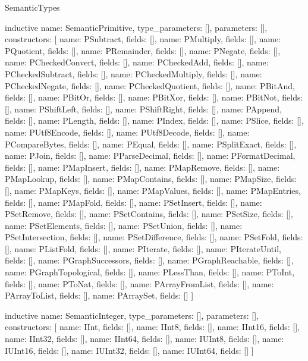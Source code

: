 \begin{lexlean}{SemanticTypes}
\begin{semanticmodule}
inductive{
  name: SemanticPrimitive,
  type_parameters: [],
  parameters: [],
  constructors: [
    {name: PSubtract, fields: []},
    {name: PMultiply, fields: []},
    {name: PQuotient, fields: []},
    {name: PRemainder, fields: []},
    {name: PNegate, fields: []},
    {name: PCheckedConvert, fields: []},
    {name: PCheckedAdd, fields: []},
    {name: PCheckedSubtract, fields: []},
    {name: PCheckedMultiply, fields: []},
    {name: PCheckedNegate, fields: []},
    {name: PCheckedQuotient, fields: []},
    {name: PBitAnd, fields: []},
    {name: PBitOr, fields: []},
    {name: PBitXor, fields: []},
    {name: PBitNot, fields: []},
    {name: PShiftLeft, fields: []},
    {name: PShiftRight, fields: []},
    {name: PAppend, fields: []},
    {name: PLength, fields: []},
    {name: PIndex, fields: []},
    {name: PSlice, fields: []},
    {name: PUtf8Encode, fields: []},
    {name: PUtf8Decode, fields: []},
    {name: PCompareBytes, fields: []},
    {name: PEqual, fields: []},
    {name: PSplitExact, fields: []},
    {name: PJoin, fields: []},
    {name: PParseDecimal, fields: []},
    {name: PFormatDecimal, fields: []},
    {name: PMapInsert, fields: []},
    {name: PMapRemove, fields: []},
    {name: PMapLookup, fields: []},
    {name: PMapContains, fields: []},
    {name: PMapSize, fields: []},
    {name: PMapKeys, fields: []},
    {name: PMapValues, fields: []},
    {name: PMapEntries, fields: []},
    {name: PMapFold, fields: []},
    {name: PSetInsert, fields: []},
    {name: PSetRemove, fields: []},
    {name: PSetContains, fields: []},
    {name: PSetSize, fields: []},
    {name: PSetElements, fields: []},
    {name: PSetUnion, fields: []},
    {name: PSetIntersection, fields: []},
    {name: PSetDifference, fields: []},
    {name: PSetFold, fields: []},
    {name: PListFold, fields: []},
    {name: PIterate, fields: []},
    {name: PIterateUntil, fields: []},
    {name: PGraphSuccessors, fields: []},
    {name: PGraphReachable, fields: []},
    {name: PGraphTopological, fields: []},
    {name: PLessThan, fields: []},
    {name: PToInt, fields: []},
    {name: PToNat, fields: []},
    {name: PArrayFromList, fields: []},
    {name: PArrayToList, fields: []},
    {name: PArraySet, fields: []}
  ]
}

inductive{
  name: SemanticInteger,
  type_parameters: [],
  parameters: [],
  constructors: [
    {name: IInt, fields: []},
    {name: IInt8, fields: []},
    {name: IInt16, fields: []},
    {name: IInt32, fields: []},
    {name: IInt64, fields: []},
    {name: IUInt8, fields: []},
    {name: IUInt16, fields: []},
    {name: IUInt32, fields: []},
    {name: IUInt64, fields: []}
  ]
}


\end{semanticmodule}
\end{lexlean}
